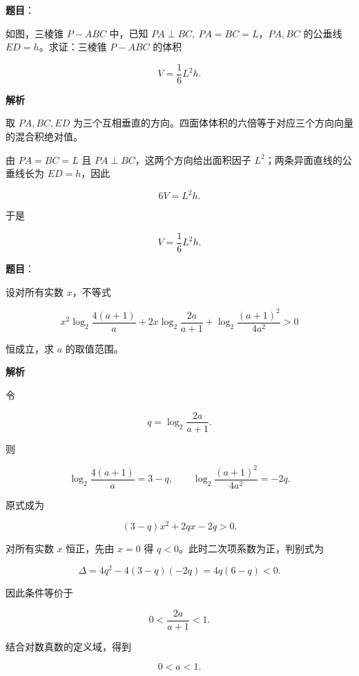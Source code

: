 \begin{answer}

\textbf{题目}：

如图，三棱锥 $P-ABC$ 中，已知 $PA\perp BC,\ PA=BC=L$，$PA,BC$ 的公垂线 $ED=h$。求证：三棱锥 $P-ABC$ 的体积

\nopagebreak[4]
\[
V=\frac16L^2h.
\]
\nopagebreak[4]
\begin{center}\end{center}
\nopagebreak[4]
\textbf{解析}

取 $PA,BC,ED$ 为三个互相垂直的方向。四面体体积的六倍等于对应三个方向向量的混合积绝对值。

由 $PA=BC=L$ 且 $PA\perp BC$，这两个方向给出面积因子 $L^2$；两条异面直线的公垂线长为 $ED=h$，因此

\nopagebreak[4]
\[
6V=L^2h.
\]

于是

\nopagebreak[4]
\[
V=\frac16L^2h.
\]


\end{answer}
\begin{answer}

\textbf{题目}：

设对所有实数 $x$，不等式

\nopagebreak[4]
\[
x^2\log_2\frac{4(a+1)}a
+2x\log_2\frac{2a}{a+1}
+\log_2\frac{(a+1)^2}{4a^2}>0
\]

恒成立，求 $a$ 的取值范围。

\textbf{解析}

令

\nopagebreak[4]
\[
q=\log_2\frac{2a}{a+1}.
\]

则

\nopagebreak[4]
\[
\log_2\frac{4(a+1)}a=3-q,\qquad
\log_2\frac{(a+1)^2}{4a^2}=-2q.
\]

原式成为

\nopagebreak[4]
\[
(3-q)x^2+2qx-2q>0.
\]

对所有实数 $x$ 恒正，先由 $x=0$ 得 $q<0$。此时二次项系数为正，判别式为

\nopagebreak[4]
\[
\Delta=4q^2-4(3-q)(-2q)=4q(6-q)<0.
\]

因此条件等价于

\nopagebreak[4]
\[
0<\frac{2a}{a+1}<1.
\]

结合对数真数的定义域，得到

\nopagebreak[4]
\[
0<a<1.
\]


\end{answer}
